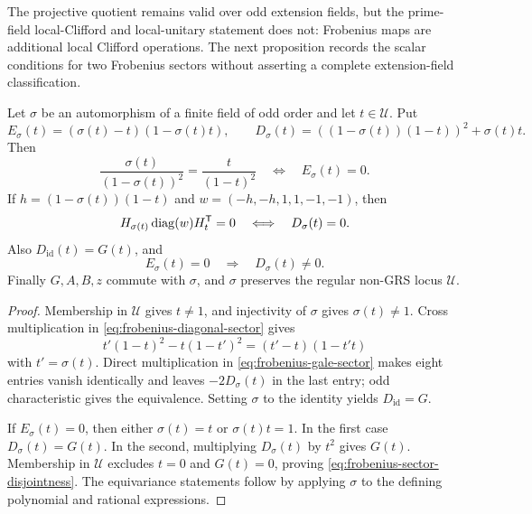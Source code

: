 The projective quotient remains valid over odd extension fields, but the
prime-field local-Clifford and local-unitary statement does not: Frobenius
maps are additional local Clifford operations.  The next proposition records
the scalar conditions for two Frobenius sectors without asserting a complete
extension-field classification.

\begin{proposition}
\label{prop:frobenius-sector-divisors}
Let \(\sigma\) be an automorphism of a finite field of odd order and let
\(t\in\mathcal U\).  Put
\[
 E_\sigma(t)=(\sigma(t)-t)(1-\sigma(t)t),\qquad
 D_\sigma(t)=((1-\sigma(t))(1-t))^2+\sigma(t)t.
\]
Then
\begin{equation}\label{eq:frobenius-diagonal-sector}
 \frac{\sigma(t)}{(1-\sigma(t))^2}
   =\frac{t}{(1-t)^2}
 \quad\Longleftrightarrow\quad E_\sigma(t)=0.
\end{equation}
If \(h=(1-\sigma(t))(1-t)\) and
\(w=(-h,-h,1,1,-1,-1)\), then
\begin{equation}\label{eq:frobenius-gale-sector}
 H_{\sigma(t)}\operatorname{diag}(w)H_t^{\mathsf T}=0
 \quad\Longleftrightarrow\quad D_\sigma(t)=0.
\end{equation}
Also \(D_{\mathrm{id}}(t)=G(t)\), and
\begin{equation}\label{eq:frobenius-sector-disjointness}
 E_\sigma(t)=0\quad\Longrightarrow\quad D_\sigma(t)\ne0.
\end{equation}
Finally \(G,A,B,z\) commute with \(\sigma\), and \(\sigma\) preserves the
regular non-GRS locus \(\mathcal U\).
\end{proposition}

\begin{proof}
Membership in \(\mathcal U\) gives \(t\ne1\), and injectivity of \(\sigma\)
gives \(\sigma(t)\ne1\).  Cross multiplication in
\eqref{eq:frobenius-diagonal-sector} gives
\[
 t'(1-t)^2-t(1-t')^2=(t'-t)(1-t't)
\]
with \(t'=\sigma(t)\).  Direct multiplication in
\eqref{eq:frobenius-gale-sector} makes eight entries vanish identically and
leaves \(-2D_\sigma(t)\) in the last entry; odd characteristic gives the
equivalence.  Setting \(\sigma\) to the identity yields
\(D_{\mathrm{id}}=G\).

If \(E_\sigma(t)=0\), then either \(\sigma(t)=t\) or
\(\sigma(t)t=1\).  In the first case \(D_\sigma(t)=G(t)\).  In the second,
multiplying \(D_\sigma(t)\) by \(t^2\) gives \(G(t)\).  Membership in
\(\mathcal U\) excludes \(t=0\) and \(G(t)=0\), proving
\eqref{eq:frobenius-sector-disjointness}.  The equivariance statements follow
by applying \(\sigma\) to the defining polynomial and rational expressions.
\end{proof}

